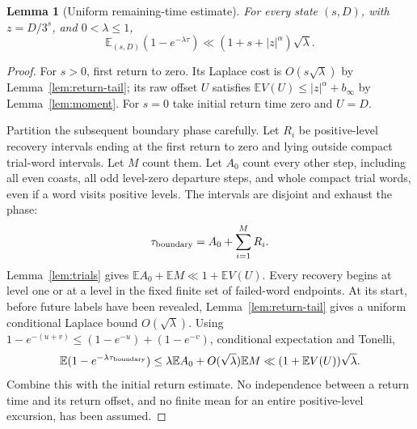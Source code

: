 \documentclass[11pt]{amsart}
\newtheorem{lemma}[theorem]{Lemma}
\theoremstyle{definition}
\theoremstyle{remark}
\newcommand{\E}{\mathbb E}
\begin{document}
\begin{lemma}[Uniform remaining-time estimate]\label{lem:remaining}
For every state $(s,D)$, with $z=D/3^s$, and $0<\lambda\le1$,
\[
 \E_{(s,D)}(1-e^{-\lambda\tau})
 \ll(1+s+|z|^\alpha)\sqrt\lambda.
\]
\end{lemma}
\begin{proof}
For $s>0$, first return to zero. Its Laplace cost is $O(s\sqrt\lambda)$ by Lemma~\ref{lem:return-tail}; its raw offset $U$ satisfies
$\E V(U)\le |z|^\alpha+b_\infty$ by Lemma~\ref{lem:moment}.
For $s=0$ take initial return time zero and $U=D$.

Partition the subsequent boundary phase carefully. Let $R_i$ be positive-level recovery intervals ending at the first return to zero and lying outside compact trial-word intervals. Let $M$ count them. Let $A_0$ count every other step, including all even coasts, all odd level-zero departure steps, and whole compact trial words, even if a word visits positive levels. The intervals are disjoint and exhaust the phase:
\[
 \tau_{\rm boundary}=A_0+\sum_{i=1}^{M}R_i.
\]
Lemma~\ref{lem:trials} gives
$\E A_0+\E M\ll1+\E V(U)$.
Every recovery begins at level one or at a level in the fixed finite set of failed-word endpoints. At its start, before future labels have been revealed, Lemma~\ref{lem:return-tail} gives a uniform conditional Laplace bound $O(\sqrt\lambda)$.
Using $1-e^{-(u+v)}\le(1-e^{-u})+(1-e^{-v})$, conditional expectation and Tonelli,
\[
 \E(1-e^{-\lambda\tau_{\rm boundary}})
 \le\lambda\E A_0+O(\sqrt\lambda)\E M
 \ll(1+\E V(U))\sqrt\lambda.
\]
Combine this with the initial return estimate. No independence between a return time and its return offset, and no finite mean for an entire positive-level excursion, has been assumed.
\end{proof}
\end{document}
